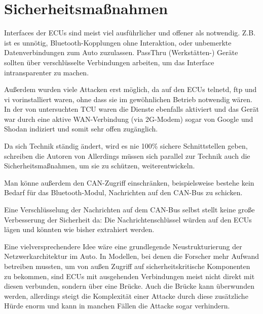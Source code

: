 \documentclass[
    fontsize=12pt,
    headings=small,
    parskip=half,           %
    bibliography=totoc,9
    numbers=noenddot,       %
    open=any,               %
    ]{scrreprt}
\begin{document}
\section{Sicherheitsmaßnahmen}
Interfaces der ECUs sind meist viel ausführlicher und offener als notwendig. Z.B. ist es unnötig, Bluetooth-Kopplungen ohne Interaktion, oder unbemerkte Datenverbindungen zum Auto zuzulassen. PassThru (Werkstätten-) Geräte sollten über verschlüsselte Verbindungen arbeiten, um das Interface intransparenter zu machen.\par
Außerdem wurden viele Attacken erst möglich, da auf den ECUs telnetd, ftp und vi vorinstalliert waren, ohne dass sie im gewöhnlichen Betrieb notwendig wären. In der von \cite{FPK15} untersuchten TCU waren die Dienste ebenfalls aktiviert und das Gerät war durch eine aktive WAN-Verbindung (via 2G-Modem) sogar von Google und Shodan indiziert und somit sehr offen zugänglich.\par
Da sich Technik ständig ändert, wird es nie 100\% sichere Schnittstellen geben, schreiben die Autoren von \cite{MiV14} Allerdings müssen sich parallel zur Technik auch die Sicherheitsmaßnahmen, um sie zu schützen, weiterentwickeln.\par
Man könne außerdem den CAN-Zugriff einschränken, beispielsweise bestehe kein Bedarf für das Bluetooth-Modul, Nachrichten auf den CAN-Bus zu schicken.\par
Eine Verschlüsselung der Nachrichten auf dem CAN-Bus selbst stellt keine große Verbesserung der Sicherheit da: Die Nachrichtenschlüssel würden auf den ECUs lägen und könnten wie bisher extrahiert werden.\par
Eine vielversprechendere Idee wäre eine grundlegende Neustrukturierung der Netzwerkarchitektur im Auto. In Modellen, bei denen die Forscher mehr Aufwand betreiben mussten, um von außen Zugriff auf sicherheitskritische Komponenten zu bekommen, sind ECUs mit ausgehenden Verbindungen meist nicht direkt mit diesen verbunden, sondern über eine Brücke. Auch die Brücke kann überwunden werden, allerdings steigt die Komplexität einer Attacke durch diese zusätzliche Hürde enorm und kann in manchen Fällen die Attacke sogar verhindern. \par
\end{document}
